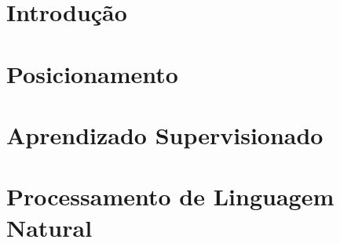 \documentclass[a4paper,12pt,oneside,openany]{book}
\begin{document}
\frontmatter
\thispagestyle{empty}



\pagebreak



\tableofcontents
\listoffigures
\listoftables
\listofalgorithms

\mainmatter
\cleardoublepage
\chapter{Introdução}
\label{introducao}


\chapter{Posicionamento}
\label{posicao}


\chapter{Aprendizado Supervisionado}
\label{supervisionado}


\chapter{Processamento de Linguagem Natural}
\label{nlp}

\end{document}

